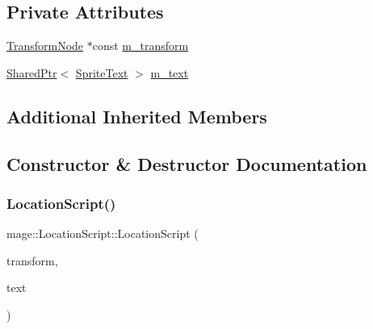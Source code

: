 \subsection*{Private Attributes}
\begin{DoxyCompactItemize}
\item 
\hyperlink{classmage_1_1_transform_node}{Transform\+Node} $\ast$const \hyperlink{classmage_1_1_location_script_a6e4ed33a4d2031c8726731c64b8200c9}{m\+\_\+transform}
\item 
\hyperlink{namespacemage_a1e01ae66713838a7a67d30e44c67703e}{Shared\+Ptr}$<$ \hyperlink{classmage_1_1_sprite_text}{Sprite\+Text} $>$ \hyperlink{classmage_1_1_location_script_ac5c7ada3b364d85888686abf20cd6463}{m\+\_\+text}
\end{DoxyCompactItemize}
\subsection*{Additional Inherited Members}


\subsection{Constructor \& Destructor Documentation}
\hypertarget{classmage_1_1_location_script_a14bc9a5868daff6401b0c8b4feebbb3e}{}\label{classmage_1_1_location_script_a14bc9a5868daff6401b0c8b4feebbb3e} 
\subsubsection{\texorpdfstring{Location\+Script()}{LocationScript()}\hspace{0.1cm}{\footnotesize\ttfamily [1/3]}}
{\footnotesize\ttfamily mage\+::\+Location\+Script\+::\+Location\+Script (\begin{DoxyParamCaption}\item[{\hyperlink{classmage_1_1_transform_node}{Transform\+Node} $\ast$}]{transform,  }\item[{\hyperlink{namespacemage_a1e01ae66713838a7a67d30e44c67703e}{Shared\+Ptr}$<$ \hyperlink{classmage_1_1_sprite_text}{Sprite\+Text} $>$}]{text }\end{DoxyParamCaption})\hspace{0.3cm}{\ttfamily [explicit]}}

\hypertarget{classmage_1_1_location_script_a53fb0562896eadb4c747d53b53f65b40}{}\label{classmage_1_1_location_script_a53fb0562896eadb4c747d53b53f65b40} 
